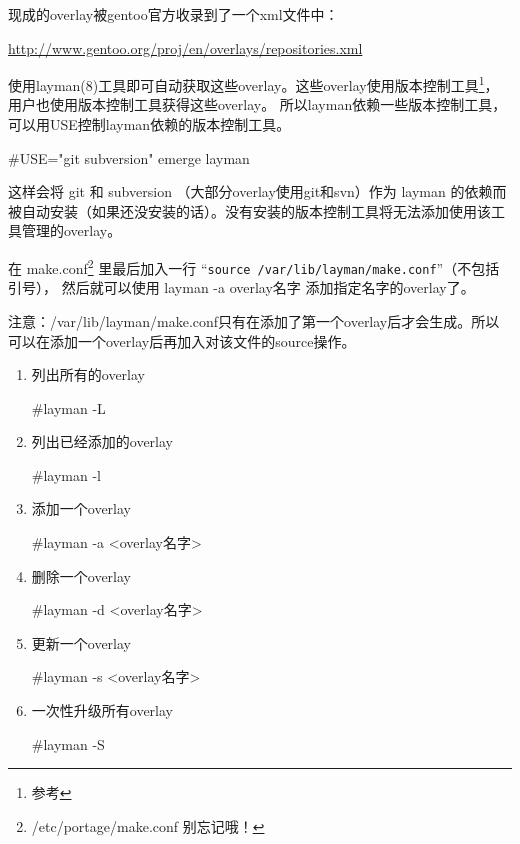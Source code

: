 现成的overlay被gentoo官方收录到了一个xml文件中：

\url{http://www.gentoo.org/proj/en/overlays/repositories.xml}

使用layman(8)工具即可自动获取这些overlay。这些overlay使用版本控制工具\footnote{参考 }，用户也使用版本控制工具获得这些overlay。
所以layman依赖一些版本控制工具，可以用USE控制layman依赖的版本控制工具。

\begin{code}
\#USE="git subversion" emerge layman
\end{code}

这样会将 git 和 subversion （大部分overlay使用git和svn）作为 layman 的依赖而被自动安装（如果还没安装的话）。没有安装的版本控制工具将无法添加使用该工具管理的overlay。

在 make.conf\footnote{ /etc/portage/make.conf 别忘记哦！} 里最后加入一行 “{\tt source /var/lib/layman/make.conf}”（不包括引号）， 然后就可以使用 layman -a overlay名字 添加指定名字的overlay了。

\begin{insertnote}
注意：/var/lib/layman/make.conf只有在添加了第一个overlay后才会生成。所以可以在添加一个overlay后再加入对该文件的source操作。
\end{insertnote}

\begin{enumerate}


\item 列出所有的overlay

\begin{code}
\#layman -L
\end{code}

\item{列出已经添加的overlay}

\begin{code}
\#layman -l
\end{code}

\item{添加一个overlay}

\begin{code}
\#layman -a <overlay名字>
\end{code}

\item{删除一个overlay}

\begin{code}
\#layman -d <overlay名字>
\end{code}

\item{更新一个overlay}

\begin{code}
\#layman -s <overlay名字>
\end{code}

\item{一次性升级所有overlay}

\begin{code}
\#layman -S
\end{code}

\end{enumerate}


